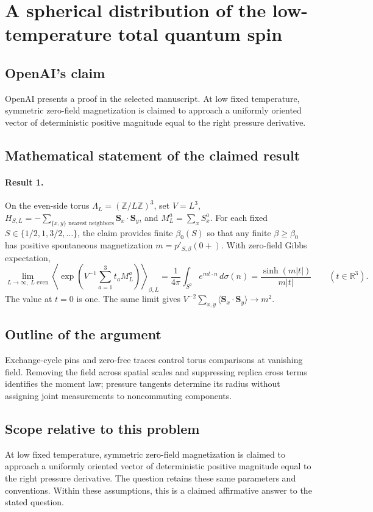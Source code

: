 \documentclass[11pt]{article}
\begin{document}
\section*{A spherical distribution of the low-temperature total quantum spin}

\subsection{OpenAI's claim}
OpenAI presents a proof in the selected manuscript. At low fixed temperature, symmetric zero-field magnetization is claimed to approach a uniformly oriented vector of deterministic positive magnitude equal to the right pressure derivative.

\subsection{Mathematical statement of the claimed result}
\paragraph{Result 1.} On the even-side torus \(\Lambda_L=(\mathbb Z/L\mathbb Z)^3\), set \(V=L^3\), \(H_{S,L}=-\sum_{\{x,y\}\text{ nearest neighbors}}\boldsymbol S_x\cdot\boldsymbol S_y\), and \(M_L^a=\sum_xS_x^a\). For each fixed $S\in\{1/2,1,3/2,\ldots\}$, the claim provides finite \(\beta_0(S)\) so that any finite \(\beta\ge\beta_0\) has positive spontaneous magnetization \(m=p'_{S,\beta}(0+)\). With zero-field Gibbs expectation,
\[
 \lim_{L\to\infty,\ L\text{ even}}
 \left\langle\exp\!\left(V^{-1}\sum_{a=1}^3t_aM_L^a\right)\right\rangle_{\beta,L}
 =\frac1{4\pi}\int_{S^2}e^{m t\cdot n}\,d\sigma(n)
 =\frac{\sinh(m|t|)}{m|t|}\qquad(t\in\mathbb R^3).
\]
The value at \(t=0\) is one. The same limit gives \(V^{-2}\sum_{x,y}\langle\boldsymbol S_x\cdot\boldsymbol S_y\rangle\to m^2\).

\subsection{Outline of the argument}
Exchange-cycle pins and zero-free traces control torus comparisons at vanishing field. Removing the field across spatial scales and suppressing replica cross terms identifies the moment law; pressure tangents determine its radius without assigning joint measurements to noncommuting components.

\subsection{Scope relative to this problem}
At low fixed temperature, symmetric zero-field magnetization is claimed to approach a uniformly oriented vector of deterministic positive magnitude equal to the right pressure derivative. The question retains these same parameters and conventions. Within these assumptions, this is a claimed affirmative answer to the stated question.
\end{document}
